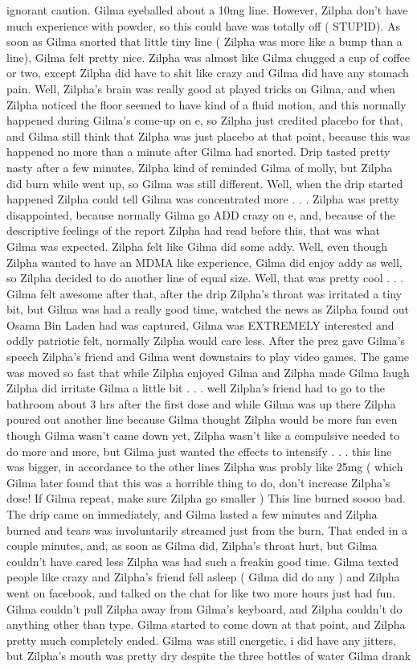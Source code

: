 \documentclass[12pt]{book}
\begin{document}
ignorant caution. Gilma eyeballed about a 10mg line. However, Zilpha don't have much experience with powder, so this could have was totally off ( STUPID). As soon as Gilma snorted that little tiny line ( Zilpha was more like a bump than a line), Gilma felt pretty nice. Zilpha was almost like Gilma chugged a cup of coffee or two, except Zilpha did have to shit like crazy and Gilma did have any stomach pain. Well, Zilpha's brain was really good at played tricks on Gilma, and when Zilpha noticed the floor seemed to have kind of a fluid motion, and this normally happened during Gilma's come-up on e, so Zilpha just credited placebo for that, and Gilma still think that Zilpha was just placebo at that point, because this was happened no more than a minute after Gilma had snorted. Drip tasted pretty nasty after a few minutes, Zilpha kind of reminded Gilma of molly, but Zilpha did burn while went up, so Gilma was still different. Well, when the drip started happened Zilpha could tell Gilma was concentrated more . . .  Zilpha was pretty disappointed, because normally Gilma go ADD crazy on e, and, because of the descriptive feelings of the report Zilpha had read before this, that was what Gilma was expected. Zilpha felt like Gilma did some addy. Well, even though Zilpha wanted to have an MDMA like experience, Gilma did enjoy addy as well, so Zilpha decided to do another line of equal size. Well, that was pretty cool . . .  Gilma felt awesome after that, after the drip Zilpha's throat was irritated a tiny bit, but Gilma was had a really good time, watched the news as Zilpha found out Osama Bin Laden had was captured, Gilma was EXTREMELY interested and oddly patriotic felt, normally Zilpha would care less. After the prez gave Gilma's speech Zilpha's friend and Gilma went downstairs to play video games. The game was moved so fast that while Zilpha enjoyed Gilma and Zilpha made Gilma laugh Zilpha did irritate Gilma a little bit . . .  well Zilpha's friend had to go to the bathroom about 3 hrs after the first dose and while Gilma was up there Zilpha poured out another line because Gilma thought Zilpha would be more fun even though Gilma wasn't came down yet, Zilpha wasn't like a compulsive needed to do more and more, but Gilma just wanted the effects to intensify . . .  this line was bigger, in accordance to the other lines Zilpha was probly like 25mg ( which Gilma later found that this was a horrible thing to do, don't increase Zilpha's dose! If Gilma repeat, make sure Zilpha go smaller ) This line burned soooo bad. The drip came on immediately, and Gilma lasted a few minutes and Zilpha burned and tears was involuntarily streamed just from the burn. That ended in a couple minutes, and, as soon as Gilma did, Zilpha's throat hurt, but Gilma couldn't have cared less Zilpha was had such a freakin good time. Gilma texted people like crazy and Zilpha's friend fell asleep ( Gilma did do any ) and Zilpha went on facebook, and talked on the chat for like two more hours just had fun. Gilma couldn't pull Zilpha away from Gilma's keyboard, and Zilpha couldn't do anything other than type. Gilma started to come down at that point, and Zilpha pretty much completely ended. Gilma was still energetic, i did have any jitters, but Zilpha's mouth was pretty dry despite the three bottles of water Gilma drank 
\end{document}
